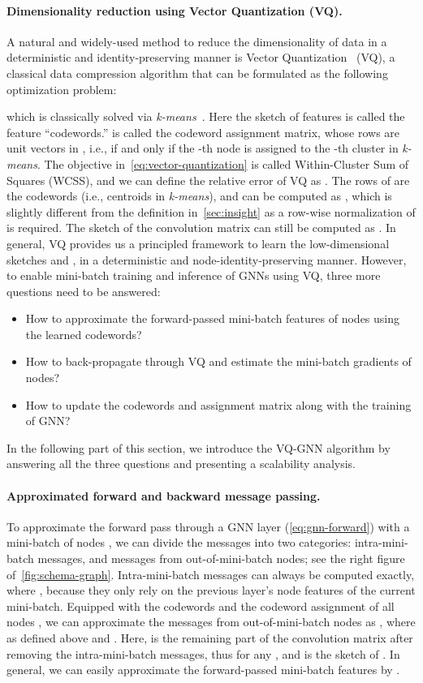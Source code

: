 \documentclass{article}
\newcommand{\cm}{\paragraph}
\renewcommand{\emph}[1]{\textit{#1}}
\begin{document}
\cm{Dimensionality reduction using Vector Quantization (VQ).}
A natural and widely-used method to reduce the dimensionality of data in a deterministic and identity-preserving manner is Vector Quantization~\citep{gray1998quantization} (VQ), a classical data compression algorithm that can be formulated as the following optimization problem:

which is classically solved via \emph{k-means}~\citep{gray1998quantization}. Here the sketch of features  is called the feature ``codewords.''  is called the codeword assignment matrix, whose rows are unit vectors in , i.e.,  if and only if the -th node is assigned to the -th cluster in \emph{k-means}. The objective in~\cref{eq:vector-quantization} is called Within-Cluster Sum of Squares (WCSS), and we can define the relative error of VQ as . The rows of  are the  codewords (i.e., centroids in \emph{k-means}), and can be computed as , which is slightly different from the definition in~\cref{sec:insight} as a row-wise normalization of  is required. The sketch of the convolution matrix  can still be computed as . In general, VQ provides us a principled framework to learn the low-dimensional sketches  and , in a deterministic and node-identity-preserving manner. However, to enable mini-batch training and inference of GNNs using VQ, three more questions need to be answered:
\begin{itemize}[leftmargin=*, topsep=1.5pt]
\setlength\itemsep{0.75pt}
    \item How to approximate the forward-passed mini-batch features of nodes using the learned codewords?
    \item How to back-propagate through VQ and estimate the mini-batch gradients of nodes?
    \item How to update the codewords and assignment matrix along with the training of GNN?
\end{itemize}
In the following part of this section, we introduce the VQ-GNN algorithm by answering all the three questions and presenting a scalability analysis.



\cm{Approximated forward and backward message passing.}
To approximate the forward pass through a GNN layer (\cref{eq:gnn-forward}) with a mini-batch of nodes , we can divide the messages into two categories: intra-mini-batch messages, and messages from out-of-mini-batch nodes; see the right figure of~\cref{fig:schema-graph}. Intra-mini-batch messages  can always be computed exactly, where , because they only rely on the previous layer's node features of the current mini-batch. Equipped with the codewords  and the codeword assignment of all nodes , we can approximate the messages from out-of-mini-batch nodes as , where  as defined above and . Here,  is the remaining part of the convolution matrix after removing the intra-mini-batch messages, thus  for any , and  is the sketch of . In general, we can easily approximate the forward-passed mini-batch features  by .
\end{document}
